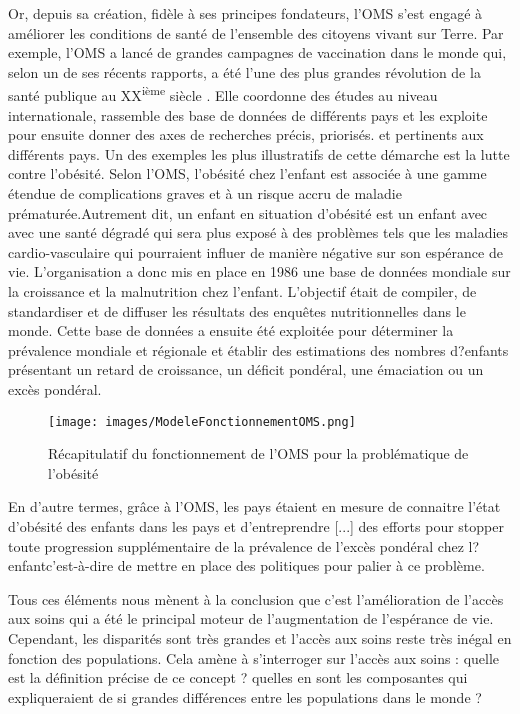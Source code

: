 Or, depuis sa création, fidèle à ses principes fondateurs, l'OMS s'est engagé à améliorer les conditions de santé de l'ensemble des citoyens vivant sur Terre. Par exemple, l'OMS a lancé de grandes campagnes de vaccination dans le monde qui, selon un de ses récents rapports, \og a été l'une des plus grandes révolution de la santé publique au XX\textsuperscript{ième} siècle \fg. Elle coordonne des études au niveau internationale, rassemble des base de données de différents pays et les exploite pour ensuite donner des axes de recherches précis, priorisés.  et pertinents aux différents pays. Un des exemples les plus illustratifs de cette démarche est la lutte contre l'obésité. Selon l'OMS, \og l'obésité chez l'enfant est associée à une gamme étendue de complications graves et à un risque accru de maladie prématurée.\fg Autrement dit, un enfant en situation d'obésité est un enfant avec avec une santé dégradé qui sera plus exposé à des problèmes tels que les maladies cardio-vasculaire qui pourraient influer de manière négative sur son espérance de vie. L'organisation a donc mis en place en 1986 une base de données mondiale sur la croissance et la malnutrition chez l'enfant. L'objectif était \og de compiler, de standardiser et de diffuser les résultats des enquêtes nutritionnelles dans le monde\fg. Cette base de données a ensuite été exploitée \og pour déterminer la prévalence mondiale et régionale et établir des estimations des nombres d?enfants présentant  un  retard  de  croissance,  un  déficit  pondéral,  une émaciation ou un excès pondéral\fg.

\begin{figure}[htbp]
\begin{center}
\texttt{[image: images/ModeleFonctionnementOMS.png]} 
\end{center}
\caption{Récapitulatif du fonctionnement de l'OMS pour la problématique de l'obésité}
\label{Récapitulatif du fonctionnement de l'OMS pour la problématique de l'obésité}
\end{figure}

En d'autre termes, grâce à l'OMS, les pays étaient en mesure de connaitre l'état d'obésité des enfants dans les pays et \og d'entreprendre [...] des efforts pour stopper toute progression supplémentaire de la prévalence de l'excès pondéral chez l?enfant\fg c'est-à-dire de mettre en place des politiques pour palier à ce problème.


Tous ces éléments nous mènent à la conclusion que c'est l'amélioration de l'accès aux soins qui a été le principal moteur de l'augmentation de l'espérance de vie. Cependant, les disparités sont très grandes et l'accès aux soins reste très inégal en fonction des populations.
Cela amène à s'interroger sur l'accès aux soins : quelle est la définition précise de ce concept ? quelles en sont les composantes qui expliqueraient de si grandes différences entre les populations dans le monde ?